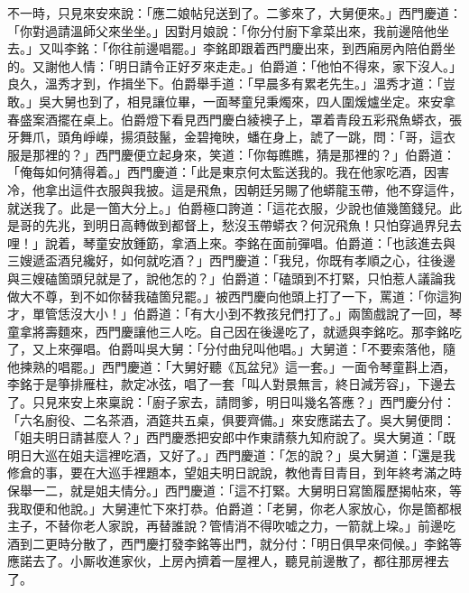 不一時，只見來安來說：「應二娘帖兒送到了。二爹來了，大舅便來。」西門慶道：「你對過請溫師父來坐坐。」因對月娘說：「你分付廚下拿菜出來，我前邊陪他坐去。」又叫李銘：「你往前邊唱罷。」李銘即跟着西門慶出來，到西廂房內陪伯爵坐的。又謝他人情：「明日請令正好歹來走走。」伯爵道：「他怕不得來，家下沒人。」良久，溫秀才到，作揖坐下。伯爵舉手道：「早晨多有累老先生。」溫秀才道：「豈敢。」吳大舅也到了，相見讓位畢，一面琴童兒秉燭來，四人圍煖爐坐定。來安拿春盛案酒擺在桌上。伯爵燈下看見西門慶白綾襖子上，罩着青段五彩飛魚蟒衣，張牙舞爪，頭角崢嶸，揚須鼓鬣，金碧掩映，蟠在身上，諕了一跳，問：「哥，這衣服是那裡的？」西門慶便立起身來，笑道：「你每瞧瞧，猜是那裡的？」伯爵道：「俺每如何猜得着。」西門慶道：「此是東京何太監送我的。{}我在他家吃酒，因害冷，他拿出這件衣服與我披。這是飛魚，因朝廷另賜了他蟒龍玉帶，他不穿這件，就送我了。此是一箇大分上。」伯爵極口誇道：「這花衣服，少說也値幾箇錢兒。此是哥的先兆，到明日高轉做到都督上，愁沒玉帶蟒衣？何況飛魚！只怕穿過界兒去哩！」{}說着，琴童安放鍾筯，拿酒上來。李銘在面前彈唱。伯爵道：「也該進去與三嫂遞盃酒兒纔好，如何就吃酒？」西門慶道：「我兒，你既有孝順之心，往後邊與三嫂磕箇頭兒就是了，說他怎的？」伯爵道：「磕頭到不打緊，只怕惹人議論我做大不尊，到不如你替我磕箇兒罷。」被西門慶向他頭上打了一下，罵道：「你這狗才，單管恁沒大小！」伯爵道：「有大小到不教孩兒們打了。」兩箇戲說了一回，琴童拿將壽麵來，西門慶讓他三人吃。自己因在後邊吃了，就遞與李銘吃。那李銘吃了，又上來彈唱。伯爵叫吳大舅：「分付曲兒叫他唱。」大舅道：「不要索落他，隨他揀熟的唱罷。」西門慶道：「大舅好聽《瓦盆兒》這一套。」一面令琴童斟上酒，李銘于是箏排雁柱，款定冰弦，唱了一套「叫人對景無言，終日減芳容」，下邊去了。只見來安上來稟說：「廚子家去，請問爹，明日叫幾名答應？」西門慶分付：「六名廚役、二名茶酒，酒筵共五桌，俱要齊備。」來安應諾去了。吳大舅便問：「姐夫明日請甚麼人？」西門慶悉把安郎中作東請蔡九知府說了。吳大舅道：「既明日大巡在姐夫這裡吃酒，又好了。」西門慶道：「怎的說？」吳大舅道：「還是我修倉的事，要在大巡手裡題本，望姐夫明日說說，教他青目青目，到年終考滿之時保舉一二，就是姐夫情分。」西門慶道：「這不打緊。大舅明日寫箇履歷揭帖來，等我取便和他說。」大舅連忙下來打恭。伯爵道：「老舅，你老人家放心，你是箇都根主子，不替你老人家說，再替誰說？管情消不得吹嘘之力，一箭就上垜。」{}前邊吃酒到二更時分散了，西門慶打發李銘等出門，就分付：「明日俱早來伺候。」李銘等應諾去了。小厮收進家伙，上房內擠着一屋裡人，聽見前邊散了，都往那房裡去了。

